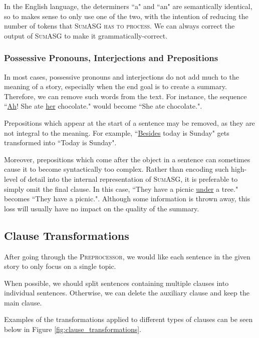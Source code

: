 In the English language, the determiners ``a" and ``an" are semantically identical, so to makes sense to only use one of the two, with the intention of reducing the number of tokens that \textsc{SumASG has to process}. We can always correct the output of \textsc{SumASG} to make it grammatically-correct.

\subsubsection{Possessive Pronouns, Interjections and Prepositions}

In most cases, possessive pronouns and interjections do not add much to the meaning of a story, especially when the end goal is to create a summary. Therefore, we can remove such words from the text. For instance, the sequence ``\underline{Ah}! She ate \underline{her} chocolate." would become ``She ate chocolate.".

Prepositions which appear at the start of a sentence may be removed, as they are not integral to the meaning. For example, ``\underline{Besides} today is Sunday" gets transformed into ``Today is Sunday".

Moreover, prepositions which come after the object in a sentence can sometimes cause it to become syntactically too complex. Rather than encoding such high-level of detail into the internal representation of \textsc{SumASG}, it is preferable to simply omit the final clause. In this case, ``They have a picnic \underline{under} a tree." becomes ``They have a picnic.". Although some information is thrown away, this loss will usually have no impact on the quality of the summary.

\subsection{Clause Transformations}

After going through the \textsc{Preprocessor}, we would like each sentence in the given story to only focus on a single topic.

When possible, we should split sentences containing multiple clauses into individual sentences. Otherwise, we can delete the auxiliary clause and keep the main clause.

Examples of the transformations applied to different types of clauses can be seen below in Figure \ref{fig:clause_transformations}.

